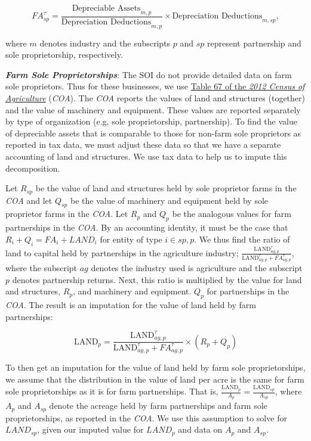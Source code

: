 \documentclass[article,11pt,letterpaper,fleqn]{article}
\theoremstyle{definition}
\numberwithin{equation}{section}
\begin{document}
\begin{equation}
{FA}^{\tau}_{sp}=\frac{\text{Depreciable Assets}_{m,p}}{\text{Depreciation Deductions}_{m,p}}\times \text{Depreciation Deductions}_{m,sp},
\end{equation}

\noindent\noindent where $m$ denotes industry and the subscripts $p$ and $sp$ represent partnership and sole proprietorship, respectively.  


\textbf{\emph{Farm Sole Proprietorships}}:  The SOI do not provide detailed data on farm sole proprietors.  Thus for these businesses, we use \href{http://www.agcensus.usda.gov/Publications/2012/Full_Report/Volume_1,_Chapter_1_US/st99_1_067_067.pdf}{Table 67 of the \emph{2012 Census of Agriculture}} (\emph{COA}).  The \emph{COA} reports the values of land and structures (together) and the value of machinery and equipment.  These values are reported separately by type of organization (e.g, sole proprietorship, partnership).  To find the value of depreciable assets that is comparable to those for non-farm sole proprietors as reported in tax data, we must adjust these data so that we have a separate accounting of land and structures.  We use tax data to help us to impute this decomposition.  

Let $R_{sp}$ be the value of land and structures held by sole proprietor farms in the \emph{COA} and let $Q_{sp}$ be the value of machinery and equipment held by sole proprietor farms in the \emph{COA}.  Let $R_{p}$ and $Q_{p}$ be the analogous values for farm partnerships in the \emph{COA}.  By an accounting identity, it must be the case that $R_{i}+Q_{i}={FA}_{i}+{LAND}_{i}$ for entity of type $i\in{sp,p}$.  We thus find the ratio of land to capital held by partnerships in the agriculture industry; $\frac{\text{LAND}^{\tau}_{ag,p}}{{\text{LAND}^{\tau}_{ag,p}}+{FA}^{\tau}_{ag,p}}$, where the subscript $ag$ denotes the industry used is agriculture and the subscript $p$ denotes partnership returns. Next, this ratio is multiplied by the value for land and structures, $R_{p}$, and machinery and equipment. $Q_{p}$ for partnerships in the \emph{COA}.  The result is an imputation for the value of land held by farm partnerships: 

\begin{equation}
\text{LAND}_{p}= \frac{\text{LAND}^{\tau}_{ag,p}}{\text{LAND}^{\tau}_{ag,p}+{FA}^{\tau}_{ag,p}}\times (R_{p}+Q_{p})
\end{equation}

To then get an imputation for the value of land held by farm sole proprietorships, we assume that the distribution in the value of land per acre is the same for farm sole proprietorships as it is for farm partnerships.  That is, $\frac{\text{LAND}_{p}}{A_{p}}=\frac{\text{LAND}_{sp}}{A_{sp}}$, where $A_{p}$ and $A_{sp}$ denote the acreage held by farm partnerships and farm sole proprietorships, as reported in the \emph{COA}.  We use this assumption to solve for ${LAND}_{sp}$, given our imputed value for ${LAND}_{p}$ and data on $A_{p}$ and ${A}_{sp}$.  
\end{document}
